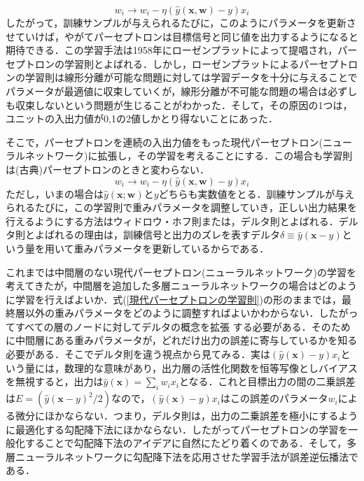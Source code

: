 \documentclass[a4paper,11pt]{jsreport}
\begin{document}
\begin{equation}
  w_i \rightarrow w_i - \eta (\hat{y}(\bm{x},\bm{w}) - y) x_i
\end{equation}
したがって，訓練サンプルが与えられるたびに，このようにパラメータを更新させていけば，やがてパーセプトロンは目標信号と同じ値を出力するようになると期待できる．この学習手法は1958年にローゼンプラットによって提唱され，パーセプトロンの学習則とよばれる．しかし，ローゼンプラットによるパーセプトロンの学習則は線形分離が可能な問題に対しては学習データを十分に与えることでパラメータが最適値に収束していくが，線形分離が不可能な問題の場合は必ずしも収束しないという問題が生じることがわかった．そして，その原因の1つは，ユニットの入出力値が0,1の2値しかとり得ないことにあった．\par
そこで，パーセプトロンを連続の入出力値をもった現代パーセプトロン(ニューラルネットワーク)に拡張し，その学習を考えることにする．この場合も学習則は(古典)パーセプトロンのときと変わらない．
\begin{equation}
  w_i \rightarrow w_i - \eta (\hat{y}(\bm{x},\bm{w}) - y) x_i \label{現代パーセプトロンの学習則}
\end{equation}
ただし，いまの場合は$\hat{y}(\bm{x};\bm{w})$と$y$どちらも実数値をとる．訓練サンプルが与えられるたびに，この学習則で重みパラメータを調整していき，正しい出力結果を行えるようにする方法はウィドロウ・ホフ則または，デルタ則とよばれる．デルタ則とよばれるの理由は，訓練信号と出力のズレを表すデルタ$\delta \equiv \hat{y}(\bm{x}-y)$という量を用いて重みパラメータを更新しているからである．\par
これまでは中間層のない現代パーセプトロン(ニューラルネットワーク)の学習を考えてきたが，中間層を追加した多層ニューラルネットワークの場合はどのように学習を行えばよいか．式(\ref{現代パーセプトロンの学習則})の形のままでは，最終層以外の重みパラメータをどのように調整すればよいかわからない．したがってすべての層のノードに対してデルタの概念を拡張
する必要がある．そのために中間層にある重みパラメータが，どれだけ出力の誤差に寄与しているかを知る必要がある．そこでデルタ則を違う視点から見てみる．実は$(\hat{y}(\bm{x})-y)x_i$という量には，数理的な意味があり，出力層の活性化関数を恒等写像としバイアスを無視すると，出力は$\hat{y}(\bm{x})=\sum_i w_i x_i$となる．これと目標出力の間の二乗誤差は$E=(\hat{y}(\bm{x}-y)^2/2)$なので，$(\hat{y}(\bm{x})-y)x_i$はこの誤差のパラメータ$w_i$による微分にほかならない．つまり，デルタ則は，出力の二乗誤差を極小にするように最適化する勾配降下法にほかならない．したがってパーセプトロンの学習を一般化することで勾配降下法のアイデアに自然にたどり着くのである．そして，多層ニューラルネットワークに勾配降下法を応用させた学習手法が誤差逆伝播法である．
\end{document}
